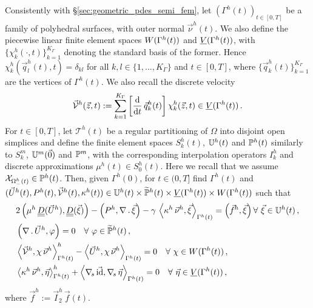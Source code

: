 Consistently with \S\ref{sec:geometric_pdes_semi_fem}, let
$(\Gamma^h(t))_{t\in[0,T]}$ be a family of polyhedral surfaces, with
outer normal $\vec\nu^h(t)$. We also define the piecewise linear finite element
spaces $\Wht$ and $\Vht$, with $\{\chi^h_k(\cdot,t)\}_{k=1}^{K_\Gamma}$
denoting the standard basis of the former. Hence $\chi^h_k(\vec q^h_l(t),t) =
\delta_{kl}$ for all $k,l \in \{1,\ldots,K_\Gamma\}$ and $t \in [0,T]$, where
$\{\vec q^h_k(t)\}_{k=1}^{K_\Gamma}$ are the vertices of $\Gamma^h(t)$.
We also recall the discrete velocity
\begin{equation*}
\V^h(\vec z, t):=
\sum_{k=1}^{K_\Gamma}\left[\ddt\,\vec q^h_k(t)\right] \chi^h_k(\vec z, t)
\in \Vht\,.
\end{equation*}
For $t\in [0,T]$, let $\mathcal{T}^h(t)$ be a regular partitioning of $\Omega$
into disjoint open simplices and define the finite element spaces $S^h_k(t)$,
$\uspacesimple^h(t)$ and $\pspace^h(t)$ similarly to $S^m_k$,
$\uspacedisc{0}{m}$ and $\pspace^m$, with the corresponding interpolation
operators $I^h_k$ and discrete approximations $\mu^h(t) \in S^h_0(t)$. Here we
recall that we assume $\charfcn{\Omega^h_-(t)}\in\pspace^h(t)$. Then, given
$\Gamma^h(0)$, for $t\in (0,T]$ find $\Gamma^h(t)$ and $(\vec U^h(t), P^h(t),
\V^h(t), \kappa^h(t)) \in \uspacesimple^h(t) \times \pnormspace^h(t) \times
\Vht \times \Wht$ such that
\begin{subequations}
\begin{align}
& 2\left(\mu^h\,\mat D(\vec U^h), \mat D(\vec \xi) \right)
- \left(P^h, \nabla\,.\,\vec \xi\right) - \gamma\,\left\langle
\kappa^h\,\vec\nu^h, \vec\xi\right\rangle_{\Gamma^h(t)} = \left(\vec f^h, \vec
\xi\right) \forall\ \vec\xi \in \uspacesimple^h(t) \,, \label{eq:sda}\\
& \left(\nabla\,.\,\vec U^h, \varphi\right)  = 0
\quad \forall\ \varphi \in \pnormspace^h(t)\,, \label{eq:sdb} \\
& \left\langle \V^h , \chi\,\vec\nu^h
\right\rangle_{\Gamma^h(t)}^h - \left\langle \vec U^h, \chi\,\vec\nu^h
\right\rangle_{\Gamma^h(t)} = 0 \quad \forall\ \chi \in \Wht\,, \label{eq:sdc}
\\
& \left\langle \kappa^h\,\vec\nu^h, \vec\eta \right\rangle_{\Gamma^h(t)}^h
+ \left\langle \nabs\,\vec\id, \nabs\,\vec \eta \right\rangle_{\Gamma^h(t)} = 0
\quad \forall\ \vec\eta \in \Vht\,, \label{eq:sdd}
\end{align}
\end{subequations}
where $\vec f^h := \vec I^h_2\,\vec f(t)$.

